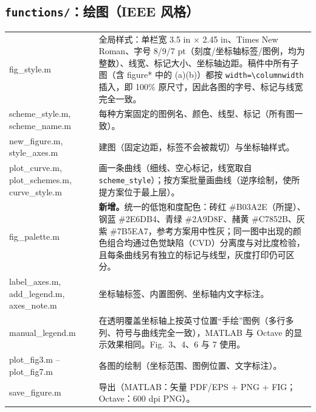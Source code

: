 \documentclass[11pt,a4paper]{ctexart}
\newcommand{\code}[1]{\texttt{#1}}
\begin{document}
\subsection{\code{functions/}：绘图（IEEE 风格）}
\begin{longtable}{>{\ttfamily\small}p{4.6cm}p{11.2cm}}
\toprule
fig\_style.m & 全局样式：单栏宽 3.5 in $\times$ 2.45 in、Times New Roman、字号 8/9/7 pt（刻度/坐标轴标签/图例，均为整数）、线宽、标记大小、坐标轴边距。稿件中所有子图（含 figure* 中的 (a)(b)）都按 \code{width=\textbackslash columnwidth} 插入，即 100\% 原尺寸，因此各图的字号、标记与线宽完全一致。\\
scheme\_style.m, scheme\_name.m & 每种方案固定的图例名、颜色、线型、标记（所有图一致）。\\
new\_figure.m, style\_axes.m & 建图（固定边距，标签不会被裁切）与坐标轴样式。\\
plot\_curve.m, plot\_schemes.m, curve\_style.m & 画一条曲线（细线、空心标记，线宽取自 \code{scheme\_style}）；按方案批量画曲线（逆序绘制，使所提方案位于最上层）。\\
fig\_palette.m & \textbf{新增。}统一的低饱和度配色：砖红 \#B03A2E（所提）、钢蓝 \#2E6DB4、青绿 \#2A9D8F、赭黄 \#C7852B、灰紫 \#7B5EA7，参考方案用中性灰；同一图中出现的颜色组合均通过色觉缺陷（CVD）分离度与对比度检验，且每条曲线另有独立的标记与线型，灰度打印仍可区分。\\
label\_axes.m, add\_legend.m, axes\_note.m & 坐标轴标签、内置图例、坐标轴内文字标注。\\
manual\_legend.m & 在透明覆盖坐标轴上按英寸位置“手绘”图例（多行多列、符号与曲线完全一致），MATLAB 与 Octave 的显示效果相同。Fig.~3、4、6 与 7 使用。\\
plot\_fig3.m -- plot\_fig7.m & 各图的绘制（坐标范围、图例位置、文字标注）。\\
save\_figure.m & 导出（MATLAB：矢量 PDF/EPS + PNG + FIG；Octave：600 dpi PNG）。\\
\bottomrule
\end{longtable}

\end{document}
